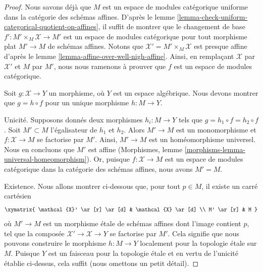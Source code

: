 \begin{proof}
Nous savons déjà que $M$ est un espace de modules catégorique uniforme
dans la catégorie des schémas affines. D'après le
lemme \ref{lemma-check-uniform-categorical-quotient-on-affines},
il suffit de montrer que le changement de base
$f' : M' \times_M \mathcal{X} \to M'$
est un espace de modules catégorique pour tout morphisme plat
$M' \to M$ de schémas affines.
Notons que $\mathcal{X}' = M' \times_M \mathcal{X}$ est presque affine d'après le
lemme \ref{lemma-affine-over-well-nigh-affine}.
Ainsi, en remplaçant $\mathcal{X}$ par $\mathcal{X}'$
et $M$ par $M'$, nous nous ramenons à prouver que $f$ est un espace de modules
catégorique.

\medskip\noindent
Soit $g : \mathcal{X} \to Y$ un morphisme, où $Y$ est un espace algébrique.
Nous devons montrer que $g = h \circ f$ pour un unique morphisme $h : M \to Y$.

\medskip\noindent
Unicité. Supposons donnés deux morphismes $h_i : M \to Y$ tels que
$g = h_1 \circ f = h_2 \circ f$. Soit $M' \subset M$ l'égalisateur
de $h_1$ et $h_2$. Alors $M' \to M$ est un monomorphisme et
$f : \mathcal{X} \to M$ se factorise par $M'$. Ainsi, $M' \to M$
est un homéomorphisme universel. Nous en concluons que $M'$ est affine
(Morphismes, lemme \ref{morphisms-lemma-universal-homeomorphism}).
Or, puisque $f : \mathcal{X} \to M$
est un espace de modules catégorique dans la catégorie des schémas affines,
nous avons $M' = M$.

\medskip\noindent
Existence. Nous allons montrer ci-dessous que, pour tout $p \in M$, il existe
un carré cartésien
$$
\xymatrix{
\mathcal{X}' \ar[r] \ar[d] & \mathcal{X} \ar[d] \\
M' \ar[r] & M
}
$$
où $M' \to M$ est un morphisme \'etale de schémas affines dont l'image contient $p$, tel que
la composée $\mathcal{X}' \to \mathcal{X} \to Y$ se factorise par $M'$.
Cela signifie que nous pouvons construire le morphisme $h : M \to Y$ localement pour la topologie \'etale sur $M$.
Puisque $Y$ est un faisceau pour la topologie \'etale et en vertu de l'unicité établie
ci-dessus, cela suffit (nous omettons un petit détail).


\end{proof}
